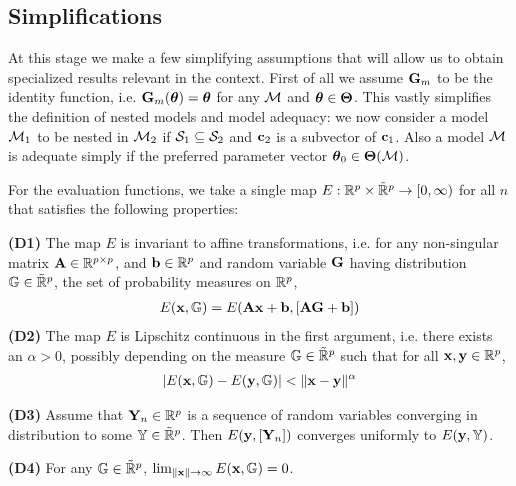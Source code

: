 \subsection{Simplifications}
At this stage we make a few simplifying assumptions that will allow us to obtain specialized results relevant in the context. First of all we assume ${\mathbf{G}}_{m}$ to be the identity function, i.e. ${\mathbf{G}}_{m} ({\boldsymbol{\theta}} ) = {\boldsymbol{\theta}}$ for any ${\cal{M}}$ and ${\boldsymbol{\theta}} \in {\boldsymbol{\Theta}}$. This vastly simplifies the definition of nested models and model adequacy: we now consider a model ${\cal{M}}_{1}$ to be nested in ${\cal{M}}_2$ if ${\cal{S}}_1 \subseteq {\cal{S}}_2$ and ${\bf{c}}_2$ is a subvector of ${\bf{c}}_1$. Also a model ${\cal{M}}$ is adequate simply if the preferred parameter vector ${\boldsymbol{\theta}}_0 \in {\boldsymbol{\Theta}}( {\cal{M}})$.

For the evaluation functions, we take a single map $E: {\mathbb{R}}^p \times \tilde {{\mathbb{R}}}^p \rightarrow [0, \infty) $ for all $n$ that satisfies the following properties:

\vspace{1em}
\noindent\textbf{(D1)}
The map $E$ is invariant to affine transformations, i.e. for any non-singular matrix ${\mathbf{A}} \in {\mathbb{R}}^{p \times p}$, and ${\bf{b}} \in {\mathbb{R}}^p$ and random variable ${\mathbf{G}}$ having distribution ${\mathbb{G}} \in \tilde {{\mathbb{R}}}^p$, the set of probability measures on ${\mathbb{R}}^p$,
%
\begin{align}
E ({\bf{x}}, {\mathbb{G}}) = E ( {\mathbf{A}} {\bf{x}} + {\bf{b}}, [ {\mathbf{A}} {\mathbf{G}} + {\bf{b}} ])
\end{align}
%
\noindent\textbf{(D2)}
The map $E$ is Lipschitz continuous in the first argument, i.e. there exists an $\alpha > 0$, possibly depending on the measure ${\mathbb{G}} \in \tilde {{\mathbb{R}}}^p$ such that for all ${\bf{x}}, {\bf{y}} \in {\mathbb{R}}^p$,
%
\begin{align}
| E ({\bf{x}}, {\mathbb{G}}) - E ( {\bf{y}}, {\mathbb{G}} ) | < \| {\bf{x}} - {\bf{y}} \|^{ \alpha }
\end{align}


\noindent\textbf{(D3)}
Assume that ${\mathbf{Y}}_{n} \in {\mathbb{R}}^{p}$ is a sequence of random variables converging in distribution to some ${\mathbb{Y}} \in \tilde {{\mathbb{R}}}^p$. Then $E ({\bf{y}}, [{\mathbf{Y}}_n])$  converges uniformly to $E ({\bf{y}}, {\mathbb{Y}}) $.

\noindent\textbf{(D4)}
For any ${\mathbb{G}} \in \tilde {{\mathbb{R}}}^p$, $\lim_{\| {\bf{x}} \| \rightarrow \infty} E( {\bf{x}}, {\mathbb{G}}) = 0$.

